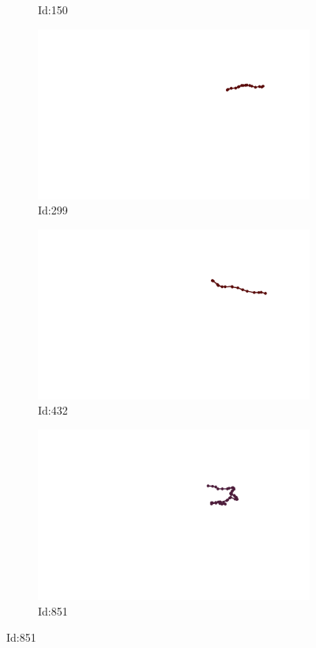 \documentclass[12pt,twoside]{report}
\begin{document}
\begin{figure}
\begin{subfigure}[b]{0.20\textwidth}
\caption{Id:150}
\end{subfigure}
\begin{subfigure}[b]{0.20\textwidth}
\centering
\includegraphics[width=\textwidth]{../../trajectories/299.png}
\caption{Id:299}
\end{subfigure}
\begin{subfigure}[b]{0.20\textwidth}
\centering
\includegraphics[width=\textwidth]{../../trajectories/432.png}
\caption{Id:432}
\end{subfigure}
\begin{subfigure}[b]{0.20\textwidth}
\centering
\includegraphics[width=\textwidth]{../../trajectories/851.png}
\caption{Id:851}
\end{subfigure}
\end{figure}
\end{document}
